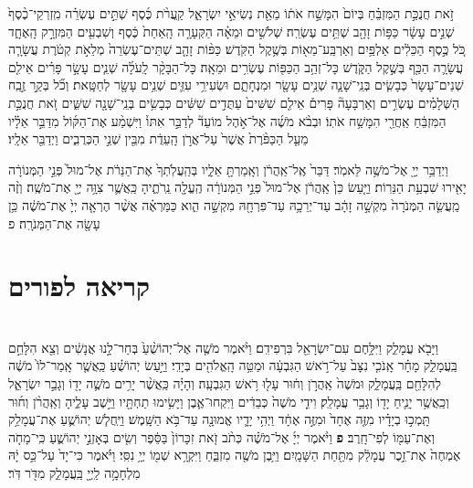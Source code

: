 \documentclass[twoside, openany, parskip=half, 11pt]{book}
\begin{document}
\begin{footnotesize}
\begin{multicols}{2}
זֹ֣את חֲנֻכַּ֣ת הַמִּזְבֵּ֗חַ בְּיוֹם֙ הִמָּשַׁ֣ח אֹת֔וֹ מֵאֵ֖ת נְשִׂיאֵ֣י יִשְׂרָאֵ֑ל קַֽעֲרֹ֨ת כֶּ֜סֶף שְׁתֵּ֣ים עֶשְׂרֵ֗ה מִֽזְרְקֵי־כֶ֨סֶף֙ שְׁנֵ֣ים עָשָׂ֔ר כַּפּ֥וֹת זָהָ֖ב שְׁתֵּ֥ים עֶשְׂרֵֽה׃ שְׁלֹשִׁ֣ים וּמֵאָ֗ה הַקְּעָרָ֤ה הָֽאַחַת֙ כֶּ֔סֶף וְשִׁבְעִ֖ים הַמִּזְרָ֣ק הָֽאֶחָ֑ד כֹּ֚ל כֶּ֣סֶף הַכֵּלִ֔ים אַלְפַּ֥יִם וְאַרְבַּֽע־מֵא֖וֹת בְּשֶׁ֥קֶל הַקֹּֽדֶשׁ׃ כַּפּ֨וֹת זָהָ֤ב שְׁתֵּים־עֶשְׂרֵה֙ מְלֵאֹ֣ת קְטֹ֔רֶת עֲשָׂרָ֧ה עֲשָׂרָ֛ה הַכַּ֖ף בְּשֶׁ֣קֶל הַקֹּ֑דֶשׁ כָּל־זְהַ֥ב הַכַּפּ֖וֹת עֶשְׂרִ֥ים וּמֵאָֽה׃ כָּל־הַבָּקָ֨ר לָֽעֹלָ֜ה שְׁנֵ֧ים עָשָׂ֣ר פָּרִ֗ים אֵילִ֤ם שְׁנֵים־עָשָׂר֙ כְּבָשִׂ֧ים בְּנֵֽי־שָׁנָ֛ה שְׁנֵ֥ים עָשָׂ֖ר וּמִנְחָתָ֑ם וּשְׂעִירֵ֥י עִזִּ֛ים שְׁנֵ֥ים עָשָׂ֖ר לְחַטָּֽאת׃ וְכֹ֞ל בְּקַ֣ר זֶ֣בַֽח הַשְּׁלָמִ֗ים עֶשְׂרִ֣ים וְאַרְבָּעָה֘ פָּרִים֒ אֵילִ֤ם שִׁשִּׁים֙ עַתֻּדִ֣ים שִׁשִּׁ֔ים כְּבָשִׂ֥ים בְּנֵֽי־שָׁנָ֖ה שִׁשִּׁ֑ים זֹ֚את חֲנֻכַּ֣ת הַמִּזְבֵּ֔חַ אַֽחֲרֵ֖י הִמָּשַׁ֥ח אֹתֽוֹ׃ וּבְבֹ֨א מֹשֶׁ֜ה אֶל־אֹ֣הֶל מוֹעֵד֘ לְדַבֵּ֣ר אִתּוֹ֒ וַיִּשְׁמַ֨ע אֶת־הַקּ֜וֹל מִדַּבֵּ֣ר אֵלָ֗יו מֵעַ֤ל הַכַּפֹּ֨רֶת֙ אֲשֶׁר֙ עַל־אֲרֹ֣ן הָֽעֵדֻ֔ת מִבֵּ֖ין שְׁנֵ֣י הַכְּרֻבִ֑ים וַיְדַבֵּ֖ר אֵלָֽיו׃

וַיְדַבֵּ֥ר יְיָ֖ אֶל־מֹשֶׁ֥ה לֵּאמֹֽר׃ דַּבֵּר֙ אֶֽל־אַֽהֲרֹ֔ן וְאָֽמַרְתָּ֖ אֵלָ֑יו בְּהַֽעֲלֹֽתְךָ֙ אֶת־הַנֵּרֹ֔ת אֶל־מוּל֙ פְּנֵ֣י הַמְּנוֹרָ֔ה יָאִ֖ירוּ שִׁבְעַ֥ת הַנֵּרֽוֹת׃ וַיַּ֤עַשׂ כֵּן֙ אַֽהֲרֹ֔ן אֶל־מוּל֙ פְּנֵ֣י הַמְּנוֹרָ֔ה הֶֽעֱלָ֖ה נֵֽרֹתֶ֑יהָ כַּֽאֲשֶׁ֛ר צִוָּ֥ה יְיָ֖ אֶת־מֹשֶֽׁה׃ וְזֶ֨ה מַֽעֲשֵׂ֤ה הַמְּנֹרָה֙ מִקְשָׁ֣ה זָהָ֔ב עַד־יְרֵכָ֥הּ עַד־פִּרְחָ֖הּ מִקְשָׁ֣ה הִ֑וא כַּמַּרְאֶ֗ה אֲשֶׁ֨ר הֶרְאָ֤ה יְיָ֙ אֶת־מֹשֶׁ֔ה כֵּ֥ן עָשָׂ֖ה אֶת־הַמְּנֹרָֽה׃ פ

\end{multicols}

\section[פורים]{קריאה לפורים}


\begin{multicols}{2}
\\
וַיָּבֹ֖א עֲמָלֵ֑ק וַיִּלָּ֥חֶם עִם־יִשְׂרָאֵ֖ל בִּרְפִידִֽם׃ וַיֹּ֨אמֶר מֹשֶׁ֤ה אֶל־יְהוֹשֻׁ֨עַ֙ בְּחַר־לָ֣נוּ אֲנָשִׁ֔ים וְצֵ֖א הִלָּחֵ֣ם בַּֽעֲמָלֵ֑ק מָחָ֗ר אָֽנֹכִ֤י נִצָּב֙ עַל־רֹ֣אשׁ הַגִּבְעָ֔ה וּמַטֵּ֥ה הָֽאֱלֹהִ֖ים בְּיָדִֽי׃ וַיַּ֣עַשׂ יְהוֹשֻׁ֗עַ כַּֽאֲשֶׁ֤ר אָֽמַר־לוֹ֙ מֹשֶׁ֔ה לְהִלָּחֵ֖ם בַּֽעֲמָלֵ֑ק וּמֹשֶׁה֙ אַֽהֲרֹ֣ן וְח֔וּר עָל֖וּ רֹ֥אשׁ הַגִּבְעָֽה׃ 
 וְהָיָ֗ה כַּֽאֲשֶׁ֨ר יָרִ֥ים מֹשֶׁ֛ה יָד֖וֹ וְגָבַ֣ר יִשְׂרָאֵ֑ל וְכַֽאֲשֶׁ֥ר יָנִ֛יחַ יָד֖וֹ וְגָבַ֥ר עֲמָלֵֽק׃ וִידֵ֤י מֹשֶׁה֙ כְּבֵדִ֔ים וַיִּקְחוּ־אֶ֛בֶן וַיָּשִׂ֥ימוּ תַחְתָּ֖יו וַיֵּ֣שֶׁב עָלֶ֑יהָ וְאַֽהֲרֹ֨ן וְח֜וּר תָּֽמְכ֣וּ בְיָדָ֗יו מִזֶּ֤ה אֶחָד֙ וּמִזֶּ֣ה אֶחָ֔ד וַיְהִ֥י יָדָ֛יו אֱמוּנָ֖ה עַד־בֹּ֥א הַשָּֽׁמֶשׁ׃ וַיַּֽחֲל֧שׁ יְהוֹשֻׁ֛עַ אֶת־עֲמָלֵ֥ק וְאֶת־עַמּ֖וֹ לְפִי־חָֽרֶב׃ \textbf{פ} 
 וַיֹּ֨אמֶר יְיָ֜ אֶל־מֹשֶׁ֗ה כְּתֹ֨ב זֹ֤את זִכָּרוֹן֙ בַּסֵּ֔פֶר וְשִׂ֖ים בְּאָזְנֵ֣י יְהוֹשֻׁ֑עַ כִּֽי־מָחֹ֤ה אֶמְחֶה֙ אֶת־זֵ֣כֶר עֲמָלֵ֔ק מִתַּ֖חַת הַשָּׁמָֽיִם׃ וַיִּ֥בֶן מֹשֶׁ֖ה מִזְבֵּ֑חַ וַיִּקְרָ֥א שְׁמ֖וֹ יְיָ֥ נִסִּֽי׃ וַיֹּ֗אמֶר כִּי־יָד֙ עַל־כֵּ֣ס יָ֔הּ מִלְחָמָ֥ה לַֽיְיָ֖ בַּֽעֲמָלֵ֑ק מִדֹּ֖ר דֹּֽר׃


\end{multicols}
\end{footnotesize}
\end{document}
